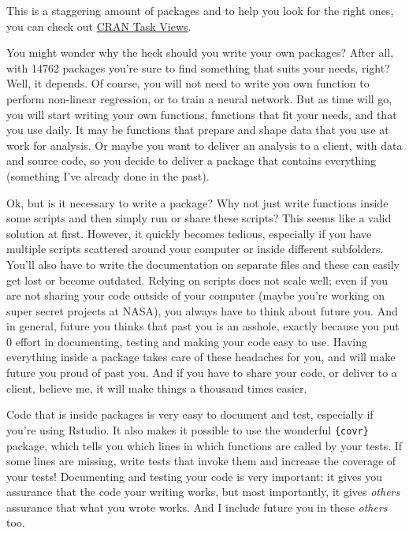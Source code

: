 \documentclass[
]{article}
\begin{document}
This is a staggering amount of packages and to help you look for the right ones, you can check
out \href{https://cran.r-project.org/}{CRAN Task Views}.

You might wonder why the heck should you write your own packages? After all, with 14762 packages
you're sure to find something that suits your needs, right? Well, it depends. Of course, you will
not need to write you own function to perform non-linear regression, or to train a neural network.
But as time will go, you will start writing your own functions, functions that fit your needs, and
that you use daily. It may be functions that prepare and shape data that you use at work for
analysis. Or maybe you want to deliver an analysis to a client, with data and source code, so
you decide to deliver a package that contains everything (something I've already done in the
past).

Ok, but is it necessary to write a package? Why not just write functions inside some scripts and
then simply run or share these scripts? This seems like a valid solution at first. However,
it quickly becomes tedious, especially if you have multiple scripts scattered around your computer
or inside different subfolders. You'll also have to write the documentation on separate files and
these can easily get lost or become outdated. Relying on scripts does not scale well; even if you
are not sharing your code outside of your computer (maybe you're working on super secret projects
at NASA), you always have to think about future you. And in general, future you thinks that past you
is an asshole, exactly because you put 0 effort in documenting, testing and making your code
easy to use. Having everything inside a package takes care of these headaches for you, and will
make future you proud of past you. And if you have to share your code, or deliver to a client,
believe me, it will make things a thousand times easier.

Code that is inside packages is very easy to document and test, especially if you're using Rstudio.
It also makes it possible to use the wonderful \texttt{\{covr\}} package, which tells you which lines in
which functions are called by your tests. If some lines are missing, write tests that invoke them and
increase the coverage of your tests! Documenting and testing your code is very important; it gives
you assurance that the code your writing works, but most importantly, it gives \emph{others} assurance
that what you wrote works. And I include future you in these \emph{others} too.
\end{document}

